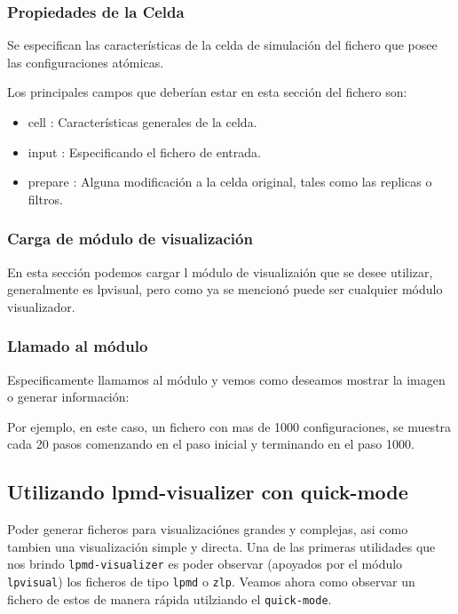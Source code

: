 \subsubsection{Propiedades de la Celda}
Se especifican las caracter\'isticas de la celda de simulaci\'on del fichero que posee las configuraciones at\'omicas.

Los principales campos que deber\'ian estar en esta secci\'on del fichero son:
\begin{itemize}
 \item cell : Caracter\'isticas generales de la celda.
 \item input : Especificando el fichero de entrada.
 \item prepare : Alguna modificaci\'on a la celda original, tales como las replicas o filtros.
\end{itemize}

\subsubsection{Carga de m\'odulo de visualizaci\'on}
En esta secci\'on podemos cargar l m\'odulo de visualizai\'on que se desee utilizar, generalmente es lpvisual, pero como ya se mencion\'o puede ser cualquier m\'odulo visualizador.


\subsubsection{Llamado al m\'odulo}
Especificamente llamamos al m\'odulo y vemos como deseamos mostrar la imagen o generar informaci\'on:


Por ejemplo, en este caso, un fichero con mas de 1000 configuraciones, se muestra cada 20 pasos comenzando en el paso inicial y terminando en el paso 1000.

\subsection{Utilizando lpmd-visualizer con quick-mode}
Poder generar ficheros para visualizaci\'ones grandes y complejas, asi como tambien una visualizaci\'on simple y directa. Una de las primeras utilidades que nos brindo \verb|lpmd-visualizer| es poder observar (apoyados por el m\'odulo \verb|lpvisual|) los ficheros de tipo \verb|lpmd| o \verb|zlp|. Veamos ahora como observar un fichero de estos de manera r\'apida utilziando el \verb|quick-mode|.

